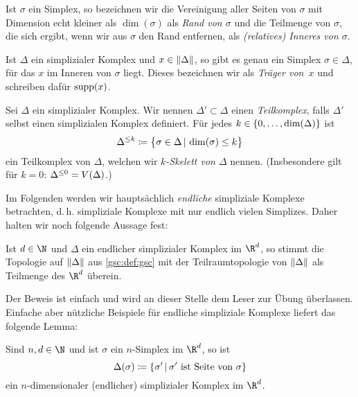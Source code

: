 \begin{thDef}
    Ist $\sigma$ ein Simplex, so bezeichnen wir die Vereinigung aller Seiten von
    $\sigma$ mit Dimension echt kleiner als $\dim(\sigma)$ als \emph{Rand von
    $\sigma$} und die Teilmenge von $\sigma$, die sich ergibt, wenn wir aus
    $\sigma$ den Rand entfernen, als \emph{(relatives) Inneres von $\sigma$}.
\end{thDef}

\begin{thDef}[Träger]
    Ist $\Delta$ ein simplizialer Komplex und $x\in\lVert\Delta\rVert$, so gibt es
    genau ein Simplex $\sigma\in\Delta$, für das $x$ im Inneren von $\sigma$
    liegt. Dieses bezeichnen wir als \emph{Träger von~$x$} und schreiben dafür
    $\operatorname{supp}(x)$.
\end{thDef}

\begin{thDef}
    Sei $\Delta$ ein simplizialer Komplex. Wir nennen $\Delta'\subset\Delta$
    einen \emph{Teilkomplex}, falls $\Delta'$ selbst einen simplizialen Komplex
    definiert.
    Für jedes $k\in\{0,\ldots,\dim(\Delta)\}$ ist
    \[ \skeleton\Delta{k} 
        \defeq \bigl\{ \sigma\in\Delta \Mid \dim(\sigma)\leq k \bigr\}
    \]
    ein Teilkomplex von $\Delta$, welchen wir \emph{$k$-Skelett von $\Delta$}
    nennen. (Insbesondere gilt für $k=0$: $\Delta^{\leq0} = V(\Delta)$.)
\end{thDef}

\bigskip
Im Folgenden werden wir hauptsächlich \emph{endliche} simpliziale Komplexe
betrachten, d.\,h. simpliziale Komplexe mit nur endlich vielen Simplizes. Daher
halten wir noch folgende Aussage fest:

\begin{thLemma}
    Ist $d\in\N$ und $\Delta$ ein endlicher simplizialer Komplex im $\R^d$, 
    so stimmt die Topologie auf $\lVert\Delta\rVert$ aus \cref{gsc:def:gsc} mit 
    der Teilraumtopologie von $\lVert\Delta\rVert$ als Teilmenge des $\R^d$
    überein.
\end{thLemma}

Der Beweis ist einfach und wird an dieser Stelle dem Leser zur Übung überlassen.
Einfache aber nützliche Beispiele für endliche simpliziale Komplexe liefert das
folgende Lemma:

\begin{thLemma}
    \label{gsc:complexofsimplex}
    Sind $n,d\in\N$ und ist $\sigma$ ein $n$-Simplex im $\R^d$, so ist
    \[ \Delta(\sigma) 
        \defeq \{ \sigma' \Mid \sigma' \text{ ist Seite von } \sigma \}
    \]
    ein $n$-dimensionaler (endlicher) simplizialer Komplex im $\R^d$.
\end{thLemma}

